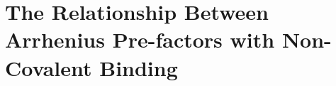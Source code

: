 \chapter{The Relationship Between Arrhenius Pre-factors with Non-Covalent Binding}
\label{ch:arrhenius}